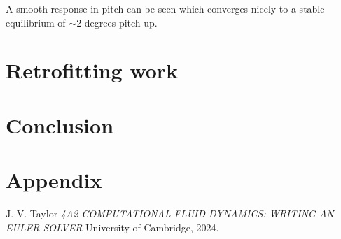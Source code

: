 \documentclass{article}
\begin{document}
A smooth response in pitch can be seen which converges nicely to a stable equilibrium of $\sim2$ degrees pitch up.



\section{Retrofitting work}



\section{Conclusion}


\section{Appendix}



\begin{thebibliography}{9}

  J. V. Taylor
  \emph{4A2 COMPUTATIONAL FLUID DYNAMICS: WRITING AN EULER SOLVER}
  University of Cambridge,
  2024.

\end{thebibliography}
\end{document}
